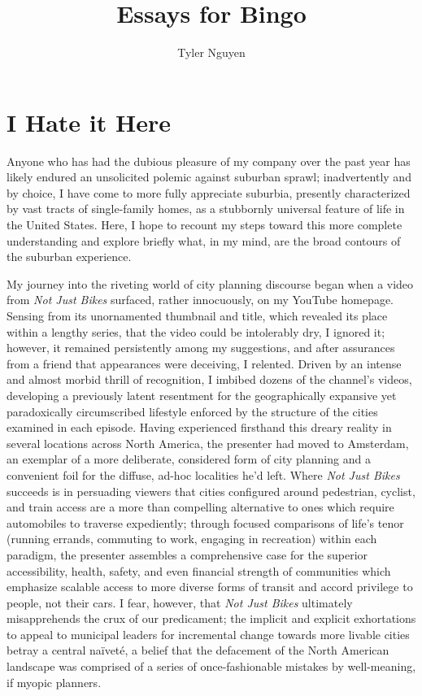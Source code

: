 \documentclass[oneside, a5paper]{book}
\begin{document}
\title{Essays for Bingo}
\author{Tyler Nguyen}
\maketitle
\chapter{I Hate it Here}
Anyone who has had the dubious pleasure of my company over the past year has likely endured an unsolicited polemic against suburban sprawl; inadvertently and by choice, I have come to more fully appreciate suburbia, presently characterized by vast tracts of single-family homes, as a stubbornly universal feature of life in the United States. Here, I hope to recount my steps toward this more complete understanding and explore briefly what, in my mind, are the broad contours of the suburban experience.

My journey into the riveting world of city planning discourse began when a video from \textit{Not Just Bikes} surfaced, rather innocuously, on my YouTube homepage. Sensing from its unornamented thumbnail and title, which revealed its place within a lengthy series, that the video could be intolerably dry, I ignored it; however, it remained persistently among my suggestions, and after assurances from a friend that appearances were deceiving, I relented. Driven by an intense and almost morbid thrill of recognition, I imbibed dozens of the channel's videos, developing a previously latent resentment for the geographically expansive yet paradoxically circumscribed lifestyle enforced by the structure of the cities examined in each episode. Having experienced firsthand this dreary reality in several locations across North America, the presenter had moved to Amsterdam, an exemplar of a more deliberate, considered form of city planning and a convenient foil for the diffuse, ad-hoc localities he'd left. Where \textit{Not Just Bikes} succeeds is in persuading viewers that cities configured around pedestrian, cyclist, and train access are a more than compelling alternative to ones which require automobiles to traverse expediently; through focused comparisons of life's tenor (running errands, commuting to work, engaging in recreation) within each paradigm, the presenter assembles a comprehensive case for the superior accessibility, health, safety, and even financial strength of communities which emphasize scalable access to more diverse forms of transit and accord privilege to people, not their cars. I fear, however, that \textit{Not Just Bikes} ultimately misapprehends the crux of our predicament; the implicit and explicit exhortations to appeal to municipal leaders for incremental change towards more livable cities betray a central na\"ivet\'e, a belief that the defacement of the North American landscape was comprised of a series of once-fashionable mistakes by well-meaning, if myopic planners.
\end{document}
